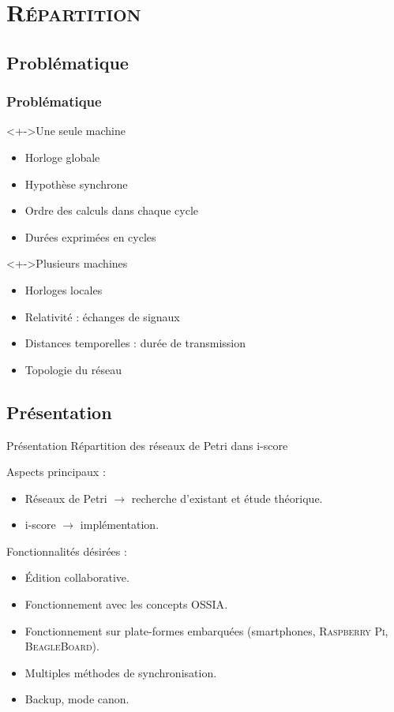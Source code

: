 \section{\scshape Répartition}
\subsection{Problématique}
\begin{frame}
	\frametitle{Problématique}
	\begin{block}<+->{Une seule machine}
		\begin{itemize}
			\item Horloge globale
			\item Hypothèse synchrone
			\item Ordre des calculs dans chaque cycle
			\item Durées exprimées en cycles
		\end{itemize}
	\end{block}
	
	\begin{block}<+->{Plusieurs machines}
		\begin{itemize}
			\item Horloges locales
			\item Relativité : échanges de signaux
			\item Distances temporelles : durée de transmission
			\item Topologie du réseau
		\end{itemize}
	\end{block}
\end{frame}
\subsection*{Présentation}
\begin{frame}{Présentation}
	{\large Répartition des réseaux de Petri dans i-score}
	
	Aspects principaux : 
	\begin{itemize}
		\item Réseaux de Petri $\rightarrow$ recherche d'existant et étude théorique.
		\item i-score $\rightarrow$ implémentation.
	\end{itemize} 
	\vspace{1em}
	
	Fonctionnalités désirées : 
	\begin{itemize}
		\item Édition collaborative.
		\item Fonctionnement avec les concepts \textsc{OSSIA}.
		\item Fonctionnement sur plate-formes embarquées (smartphones, \textsc{Raspberry Pi}, \textsc{BeagleBoard}).
		\item Multiples méthodes de synchronisation.
		\item Backup, mode canon.
	\end{itemize}
\end{frame}

